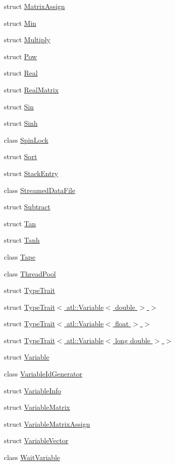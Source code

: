 \begin{DoxyCompactItemize}
\item 
struct \hyperlink{structatl_1_1_matrix_assign}{Matrix\+Assign}
\item 
struct \hyperlink{structatl_1_1_min}{Min}
\item 
struct \hyperlink{structatl_1_1_multiply}{Multiply}
\item 
struct \hyperlink{structatl_1_1_pow}{Pow}
\item 
struct \hyperlink{structatl_1_1_real}{Real}
\item 
struct \hyperlink{structatl_1_1_real_matrix}{Real\+Matrix}
\item 
struct \hyperlink{structatl_1_1_sin}{Sin}
\item 
struct \hyperlink{structatl_1_1_sinh}{Sinh}
\item 
class \hyperlink{classatl_1_1_spin_lock}{Spin\+Lock}
\item 
struct \hyperlink{structatl_1_1_sqrt}{Sqrt}
\item 
struct \hyperlink{structatl_1_1_stack_entry}{Stack\+Entry}
\item 
class \hyperlink{classatl_1_1_streamed_data_file}{Streamed\+Data\+File}
\item 
struct \hyperlink{structatl_1_1_subtract}{Subtract}
\item 
struct \hyperlink{structatl_1_1_tan}{Tan}
\item 
struct \hyperlink{structatl_1_1_tanh}{Tanh}
\item 
class \hyperlink{classatl_1_1_tape}{Tape}
\item 
class \hyperlink{classatl_1_1_thread_pool}{Thread\+Pool}
\item 
struct \hyperlink{structatl_1_1_type_trait}{Type\+Trait}
\item 
struct \hyperlink{structatl_1_1_type_trait_3_01atl_1_1_variable_3_01double_01_4_01_4}{Type\+Trait$<$ atl\+::\+Variable$<$ double $>$ $>$}
\item 
struct \hyperlink{structatl_1_1_type_trait_3_01atl_1_1_variable_3_01float_01_4_01_4}{Type\+Trait$<$ atl\+::\+Variable$<$ float $>$ $>$}
\item 
struct \hyperlink{structatl_1_1_type_trait_3_01atl_1_1_variable_3_01long_01double_01_4_01_4}{Type\+Trait$<$ atl\+::\+Variable$<$ long double $>$ $>$}
\item 
struct \hyperlink{structatl_1_1_variable}{Variable}
\item 
class \hyperlink{classatl_1_1_variable_id_generator}{Variable\+Id\+Generator}
\item 
struct \hyperlink{structatl_1_1_variable_info}{Variable\+Info}
\item 
struct \hyperlink{structatl_1_1_variable_matrix}{Variable\+Matrix}
\item 
struct \hyperlink{structatl_1_1_variable_matrix_assign}{Variable\+Matrix\+Assign}
\item 
struct \hyperlink{structatl_1_1_variable_vector}{Variable\+Vector}
\item 
class \hyperlink{classatl_1_1_wait_variable}{Wait\+Variable}
\end{DoxyCompactItemize}
